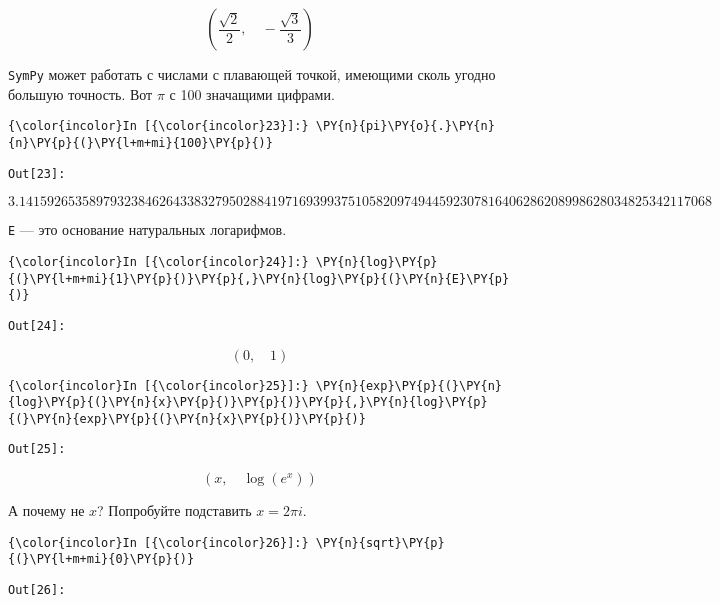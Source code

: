     \[\left ( \frac{\sqrt{2}}{2}, \quad - \frac{\sqrt{3}}{3}\right )\]

    

    \texttt{SymPy} может работать с числами с плавающей точкой, имеющими
сколь угодно большую точность. Вот \(\pi\) с 100 значащими цифрами.

    \begin{Verbatim}[commandchars=\\\{\}]
{\color{incolor}In [{\color{incolor}23}]:} \PY{n}{pi}\PY{o}{.}\PY{n}{n}\PY{p}{(}\PY{l+m+mi}{100}\PY{p}{)}
\end{Verbatim}
\texttt{\color{outcolor}Out[{\color{outcolor}23}]:}
    
    \[3.141592653589793238462643383279502884197169399375105820974944592307816406286208998628034825342117068\]

    

    \texttt{E} --- это основание натуральных логарифмов.

    \begin{Verbatim}[commandchars=\\\{\}]
{\color{incolor}In [{\color{incolor}24}]:} \PY{n}{log}\PY{p}{(}\PY{l+m+mi}{1}\PY{p}{)}\PY{p}{,}\PY{n}{log}\PY{p}{(}\PY{n}{E}\PY{p}{)}
\end{Verbatim}
\texttt{\color{outcolor}Out[{\color{outcolor}24}]:}
    
    \[\left ( 0, \quad 1\right )\]

    

    \begin{Verbatim}[commandchars=\\\{\}]
{\color{incolor}In [{\color{incolor}25}]:} \PY{n}{exp}\PY{p}{(}\PY{n}{log}\PY{p}{(}\PY{n}{x}\PY{p}{)}\PY{p}{)}\PY{p}{,}\PY{n}{log}\PY{p}{(}\PY{n}{exp}\PY{p}{(}\PY{n}{x}\PY{p}{)}\PY{p}{)}
\end{Verbatim}
\texttt{\color{outcolor}Out[{\color{outcolor}25}]:}
    
    \[\left ( x, \quad \log{\left (e^{x} \right )}\right )\]

    

    А почему не \(x\)? Попробуйте подставить \(x=2\pi i\).

    \begin{Verbatim}[commandchars=\\\{\}]
{\color{incolor}In [{\color{incolor}26}]:} \PY{n}{sqrt}\PY{p}{(}\PY{l+m+mi}{0}\PY{p}{)}
\end{Verbatim}
\texttt{\color{outcolor}Out[{\color{outcolor}26}]:}
    
